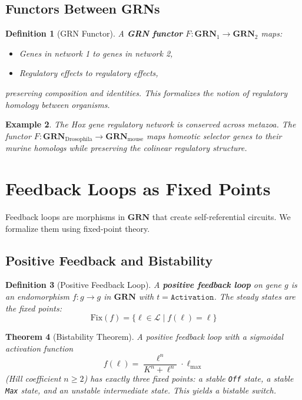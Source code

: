 \documentclass[12pt,a4paper]{article}
\newtheorem{theorem}{Theorem}[section]
\newtheorem{definition}[theorem]{Definition}
\newtheorem{example}[theorem]{Example}
\newcommand{\cat}[1]{\mathbf{#1}}
\begin{document}
\subsection{Functors Between GRNs}

\begin{definition}[GRN Functor]\label{def:grn-functor}
A \textbf{GRN functor} $F : \cat{GRN}_1 \to \cat{GRN}_2$ maps:
\begin{itemize}
  \item Genes in network 1 to genes in network 2,
  \item Regulatory effects to regulatory effects,
\end{itemize}
preserving composition and identities.  This formalizes the notion of \emph{regulatory homology} between organisms.
\end{definition}

\begin{example}
The \emph{Hox gene} regulatory network is conserved across metazoa.  The functor $F : \cat{GRN}_{\text{Drosophila}} \to \cat{GRN}_{\text{mouse}}$ maps homeotic selector genes to their murine homologs while preserving the colinear regulatory structure.
\end{example}


\section{Feedback Loops as Fixed Points}\label{sec:feedback}

Feedback loops are morphisms in $\cat{GRN}$ that create self-referential circuits.  We formalize them using fixed-point theory.

\subsection{Positive Feedback and Bistability}

\begin{definition}[Positive Feedback Loop]\label{def:positive-feedback}
A \textbf{positive feedback loop} on gene $g$ is an endomorphism $f : g \to g$ in $\cat{GRN}$ with $t = \texttt{Activation}$.  The steady states are the fixed points:
\[
\text{Fix}(f) = \{\ell \in \mathcal{L} \mid f(\ell) = \ell\}
\]
\end{definition}

\begin{theorem}[Bistability Theorem]\label{thm:bistability}
A positive feedback loop with a sigmoidal activation function
\[
f(\ell) = \frac{\ell^n}{K^n + \ell^n} \cdot \ell_{\max}
\]
(Hill coefficient $n \geq 2$) has exactly three fixed points: a stable \texttt{Off} state, a stable \texttt{Max} state, and an unstable intermediate state.  This yields a \emph{bistable switch}.
\end{theorem}
\end{document}
